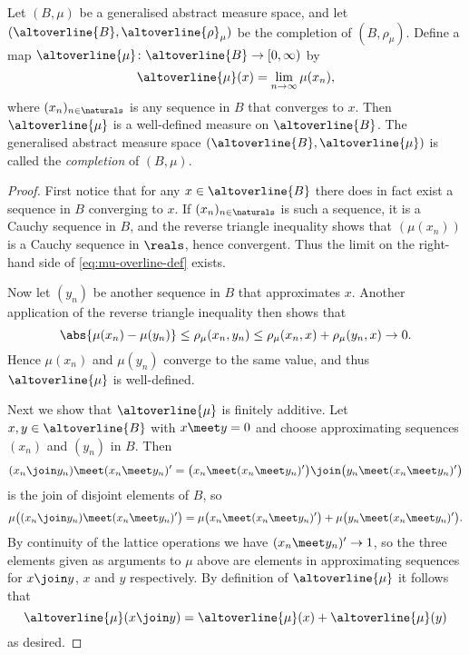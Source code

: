 \documentclass[article, a4paper, 11pt, oneside]{memoir}
\numberwithin{equation}{chapter}
\begin{document}
\begin{proposition}
    Let $(B,\mu)$ be a generalised abstract measure space, and let $(\altoverline{B}, \altoverline{\rho}_\mu)$ be the completion of $(B,\rho_\mu)$. Define a map $\altoverline{\mu} \colon \altoverline{B} \to [0,\infty)$ by
    \begin{equation}
        \label{eq:mu-overline-def}
        \altoverline{\mu}(x) = \lim_{n\to\infty} \mu(x_n),
    \end{equation}
    where $(x_n)_{n\in\naturals}$ is any sequence in $B$ that converges to $x$. Then $\altoverline{\mu}$ is a well-defined measure on $\altoverline{B}$. The generalised abstract measure space $(\altoverline{B}, \altoverline{\mu})$ is called the \emph{completion} of $(B,\mu)$.
\end{proposition}

\begin{proof}
    First notice that for any $x \in \altoverline{B}$ there does in fact exist a sequence in $B$ converging to $x$. If $(x_n)_{n\in\naturals}$ is such a sequence, it is a Cauchy sequence in $B$, and the reverse triangle inequality shows that $(\mu(x_n))$ is a Cauchy sequence in $\reals$, hence convergent. Thus the limit on the right-hand side of \eqref{eq:mu-overline-def} exists.
    
    Now let $(y_n)$ be another sequence in $B$ that approximates $x$. Another application of the reverse triangle inequality then shows that
    \begin{equation*}
        \abs{ \mu(x_n) - \mu(y_n) }
            \leq \rho_\mu(x_n,y_n)
            \leq \rho_\mu(x_n,x) + \rho_\mu(y_n,x)
            \to 0.
    \end{equation*}
    Hence $\mu(x_n)$ and $\mu(y_n)$ converge to the same value, and thus $\altoverline{\mu}$ is well-defined.

    Next we show that $\altoverline{\mu}$ is finitely additive. Let $x,y \in \altoverline{B}$ with $x \meet y = 0$ and choose approximating sequences $(x_n)$ and $(y_n)$ in $B$. Then
    \begin{equation*}
        (x_n \join y_n) \meet (x_n \meet y_n)'
            = \bigl( x_n \meet (x_n \meet y_n)' \bigr)
              \join \bigl( y_n \meet (x_n \meet y_n)' \bigr)
    \end{equation*}
    is the join of disjoint elements of $B$, so
    \begin{equation*}
        \mu \bigl( (x_n \join y_n) \meet (x_n \meet y_n)' \bigr)
            = \mu \bigl( x_n \meet (x_n \meet y_n)' \bigr)
              + \mu \bigl( y_n \meet (x_n \meet y_n)' \bigr).
    \end{equation*}
    By continuity of the lattice operations we have $(x_n \meet y_n)' \to 1$, so the three elements given as arguments to $\mu$ above are elements in approximating sequences for $x \join y$, $x$ and $y$ respectively. By definition of $\altoverline{\mu}$ it follows that
    \begin{equation*}
        \altoverline{\mu}(x \join y)
            = \altoverline{\mu}(x) + \altoverline{\mu}(y)
    \end{equation*}
    as desired.
\end{proof}
\end{document}
